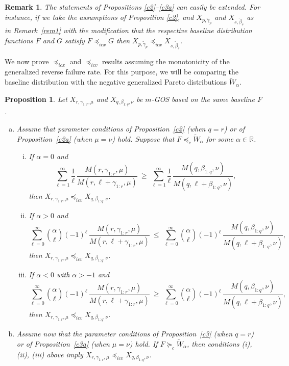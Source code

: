 \documentclass [11pt]{article}
\newtheorem{remark}{Remark}
\newtheorem{proposition}{Proposition}
\newcommand{\gos}{GOS}
\begin{document}
\begin{remark}\label{rem2}
The statements of Propositions \ref{c2}--\ref{c3a} can easily be extended. 
For instance, if we take the assumptions of Proposition \ref{c2}, and $X_{p, \tilde{\gamma}_p}$ and $X_{s,\tilde{\beta}_s}$ as in Remark~\ref{rem1} with the modification that the respective baseline distribution functions $F$ and $G$ satisfy 
$F \preceq_{icx} G$ then $X_{p, \tilde{\gamma}_p} \preceq_{icx} X_{s,\tilde{\beta}_s}$.
\end{remark}

We now prove $\preceq_{icx}$ and $\preceq_{icv}$ results assuming the monotonicity of the generalized reverse failure rate. For this purpose, we will be comparing the baseline distribution with the negative generalized Pareto distributions $\widetilde{W}_\alpha$.
\begin{proposition}
	\label{prop:neg}
	Let $X_{r,\gamma_{1:r},\mu}$ and $X_{q,\beta_{1:q},\nu}$ be {$m$-\gos} based on the same baseline $F$.
	\begin{enumerate}[(a)]
    \item
    Assume that parameter conditions of Proposition~\ref{c2} (when $q=r$) or of Proposition~\ref{c2a} (when $\mu=\nu$) hold. Suppose that $F\preceq_c \widetilde W_\alpha$ for some $\alpha\in\mathbb R$.
	\begin{enumerate}[(i)]
		\item If $\alpha=0$ and
		\[
		\sum_{\ell=1}^\infty \frac{1}{\ell}\,
\frac{M(r,\gamma_{1:r},\mu)}{M(r,\ell+\gamma_{1:r},\mu)}
		\ \ge\
		\sum_{\ell=1}^\infty \frac{1}{\ell}\,\frac{M(q,\beta_{1:q},\nu)}{M(q,\ell+\beta_{1:q},\nu)},
		\]
		then $X_{r,\gamma_{1:r},\mu}\preceq_{icv}X_{q,\beta_{1:q},\nu}$.
		
		\item If $\alpha>0$ and
		\[
		\sum_{\ell=0}^\infty
        \binom{\alpha}{\ell}(-1)^\ell\,\frac{M(r,\gamma_{1:r},\mu)}{M(r,\ell+\gamma_{1:r},\mu)} \ \le\
		\sum_{\ell=0}^\infty \binom{\alpha}{\ell}(-1)^\ell\, 
        \frac{M(q,\beta_{1:q},\nu)}{M(q,\ell+\beta_{1:q},\nu)},
		\]
		then $X_{r,\gamma_{1:r},\mu}\preceq_{icv}X_{q,\beta_{1:q},\nu}$.
		
		\item If $\alpha<0$ with $\alpha>-1$ and
		\[
		\sum_{\ell=0}^\infty \binom{\alpha}{\ell}(-1)^\ell\,
        \frac{M(r,\gamma_{1:r},\mu)}{M(r,\ell+\gamma_{1:r},\mu)}
		\ \ge\
		\sum_{\ell=0}^\infty \binom{\alpha}{\ell}(-1)^\ell\,
        \frac{M(q,\beta_{1:q},\nu)}{M(q,\ell+\beta_{1:q},\nu)},
		\]
		then $X_{r,\gamma_{1:r},\mu}\preceq_{icv}X_{q,\beta_{1:q},\nu}$.
	   \end{enumerate}

    \item
    Assume now that the parameter conditions of Proposition~\ref{c3} (when $q=r$) or of Proposition~\ref{c3a} (when $\mu=\nu$) hold. If $F\succeq_c \widetilde W_\alpha$, then conditions (i), (ii), (iii) above imply $X_{r,\gamma_{1:r},\mu}\preceq_{icv}X_{q,\beta_{1:q},\nu}$.
\end{enumerate}
\end{proposition}
\end{document}

